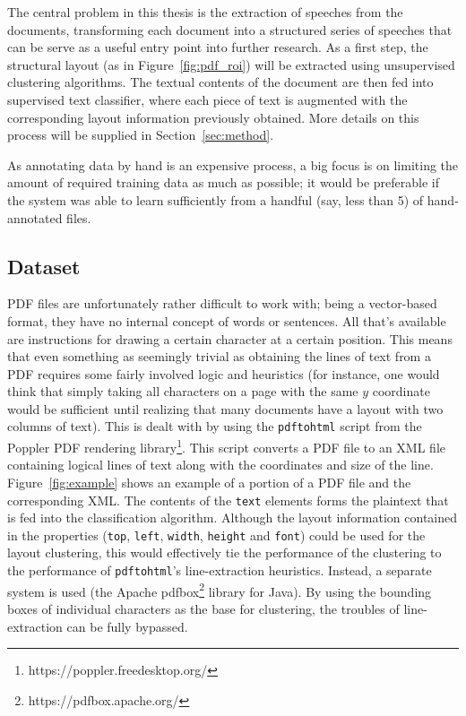 The central problem in this thesis is the extraction of speeches from the
documents, transforming each document into a structured series of speeches that
can be serve as a useful entry point into further research. As a first step, the
structural layout (as in Figure~\ref{fig:pdf_roi}) will be extracted using
unsupervised clustering algorithms. The textual contents of the document are
then fed into supervised text classifier, where each piece of text is augmented
with the corresponding layout information previously obtained. More details on
this process will be supplied in Section~\ref{sec:method}.

As annotating data by hand is an expensive process, a big focus is on limiting
the amount of required training data as much as possible; it would be preferable
if the system was able to learn sufficiently from a handful (say, less than 5)
of hand-annotated files.

\subsection{Dataset}
PDF files are unfortunately rather difficult to work with; being a vector-based
format, they have no internal concept of words or sentences. All that's
available are instructions for drawing a certain character at a certain
position. This means that even something as seemingly trivial as obtaining the
lines of text from a PDF requires some fairly involved logic and heuristics (for
instance, one would think that simply taking all characters on a page with the
same $y$ coordinate would be sufficient until realizing that many documents have
a layout with two columns of text). This is dealt with by using the
\texttt{pdftohtml} script from the Poppler PDF rendering
library\footnote{https://poppler.freedesktop.org/}. This script converts a PDF
file to an XML file containing logical lines of text along with the coordinates
and size of the line. Figure~\ref{fig:example} shows an example of a portion of
a PDF file and the corresponding XML. The contents of the \texttt{text} elements
forms the plaintext that is fed into the classification algorithm. Although the
layout information contained in the properties (\texttt{top}, \texttt{left},
\texttt{width}, \texttt{height} and \texttt{font}) could be used for the layout
clustering, this would effectively tie the performance of the clustering to the
performance of \texttt{pdftohtml}'s line-extraction heuristics. Instead, a
separate system is used (the Apache pdfbox\footnote{https://pdfbox.apache.org/}
library for Java). By using the bounding boxes of individual characters as the
base for clustering, the troubles of line-extraction can be fully bypassed.

